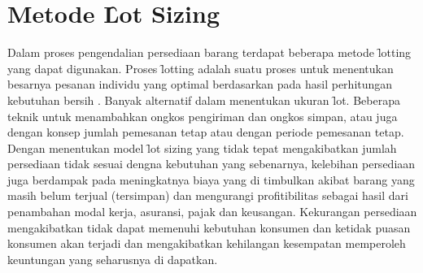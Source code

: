 \section{Metode \f{Lot Sizing}}
Dalam proses pengendalian persediaan barang terdapat beberapa metode \f{lotting} yang dapat digunakan. Proses \f{lotting} adalah suatu proses untuk menentukan besarnya pesanan individu yang optimal berdasarkan pada hasil perhitungan kebutuhan bersih \cite{Ibrahim}. Banyak alternatif dalam menentukan ukuran \f{lot}. Beberapa teknik untuk menambahkan ongkos pengiriman dan ongkos simpan, atau juga dengan konsep jumlah pemesanan tetap atau dengan periode pemesanan tetap. Dengan menentukan model \f{lot sizing} yang tidak tepat mengakibatkan jumlah persediaan tidak sesuai dengna kebutuhan yang sebenarnya, kelebihan persediaan juga berdampak pada meningkatnya biaya yang di timbulkan akibat barang yang masih belum terjual (tersimpan) dan mengurangi profitibilitas sebagai hasil dari penambahan modal kerja, asuransi, pajak dan keusangan. Kekurangan persediaan mengakibatkan tidak dapat memenuhi kebutuhan konsumen dan ketidak puasan konsumen akan terjadi dan mengakibatkan kehilangan kesempatan memperoleh keuntungan yang seharusnya di dapatkan.

